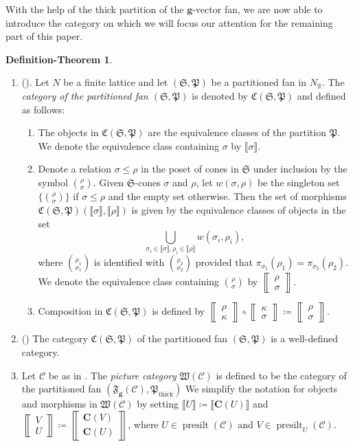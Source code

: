 \documentclass[10pt,twoside, a4paper,reqno]{amsart}
\DeclareMathOperator{\presilt}{presilt}
\DeclareMathOperator{\thick}{thick}
\newcommand{\eqclass}[1]{ \llbracket #1 \rrbracket }
\newcommand{\partfan}[1]{\mathfrak{F}_{\bfg}(#1)}
\newcommand{\catof}{\mathfrak{C}}
\newcommand{\sqbinom}[2]{\left\llbracket \!\begin{smallmatrix} #1 \\ #2 \end{smallmatrix}\!\right\rrbracket}
\newcommand{\Wfrak}{\mathfrak{W}}
\newcommand{\Pfrak}{\mathfrak{P}}
\newcommand{\R}{\mathbb{R}}
\newcommand{\calC}{\mathcal{C}}
\newcommand{\boldC}{\mathbf{C}}
\newcommand{\bfg}{\mathbf{g}}
\newcommand{\Sfan}{\mathfrak{S}}
\theoremstyle{definition}
\newtheorem{definitiontheorem}[theorem]{Definition-Theorem}
\begin{document}
With the help of the thick partition of the $\bfg$-vector fan, we are now able to introduce the category on which we will focus our attention for the remaining part of this paper.

\begin{definitiontheorem}\label{defthm:piccat}
\,
    \begin{enumerate}
        \item\label{defthm:piccat_general}(\cite[{Def.} 3.4]{Kai23}). Let $N$ be a finite lattice and let $(\Sfan, \mathfrak{P})$ be a partitioned fan in $N_{\R}$.
        	The \textit{category of {the partitioned fan} $(\Sfan, \mathfrak{P})$} is denoted by $\catof(\Sfan,\mathfrak{P})$ and defined as follows:
	\begin{enumerate}
		\item The objects in $\catof(\Sfan,\mathfrak{P})$ are the equivalence classes of the partition {$\mathfrak{P}$}. We denote the equivalence class containing $\sigma$ by $\eqclass{\sigma}$.
		\item 
        Denote a relation $\sigma\leq \rho$ in the poset of cones {in $\Sfan$ under inclusion} by the symbol $\binom{\rho}{\sigma}$.
        Given $\Sfan$-cones $\sigma$ and $\rho$, let $w(\sigma,\rho)$ be the singleton set $\{\binom{\rho}{\sigma} \}$ if $\sigma\leq \rho$ and the empty set otherwise. Then the set of morphisms $\catof(\Sfan,\mathfrak{P})(\eqclass{\sigma},\eqclass{\rho})$ is given by the equivalence classes of objects in the set
		\begin{equation}\label{eq:piccat_mor}
			\bigcup\limits_{\sigma_i\in\eqclass{\sigma}, \rho_i\in \eqclass{\rho}} w(\sigma_i,\rho_i),
		\end{equation}
		where $\binom{\rho_1}{\sigma_1}$ is identified with $\binom{\rho_2}{\sigma_2}$ provided that $\pi_{\sigma_1}(\rho_1)=\pi_{\sigma_2}(\rho_2)$. We denote the equivalence class containing $\binom{\rho}{\sigma}$ by $\sqbinom{\rho}{\sigma}$.
		\item Composition in $\catof(\Sfan,\mathfrak{P})$ is defined by $\sqbinom{\rho}{\kappa} \circ \sqbinom{\kappa}{\sigma} \coloneqq \sqbinom{\rho}{\sigma}$.
	\end{enumerate}
    \item{(\cite[{Prop.} 3.8]{Kai23})} The category $\catof(\Sfan,\mathfrak{P})$ of the partitioned fan $(\Sfan,\mathfrak{P})$ is a well-defined category.
        \item\label{defthm:piccat_0Aus} Let $\calC$ be as in . The \textit{picture category} $\Wfrak(\calC)$ is defined to be the category of the partitioned fan $(\partfan{\calC} , \Pfrak_{\thick})$
        We simplify the notation for objects and morphisms in $\Wfrak(\calC)$ by setting 
        $\eqclass{U} \coloneqq \eqclass{\boldC(U)}$  and $ \sqbinom{V}{U}\coloneqq \sqbinom{\boldC(V)}{\boldC(U)}$, where $U\in\presilt(\calC)$ and $V\in\presilt_U(\calC)$.
    \end{enumerate}
\end{definitiontheorem}
\end{document}
